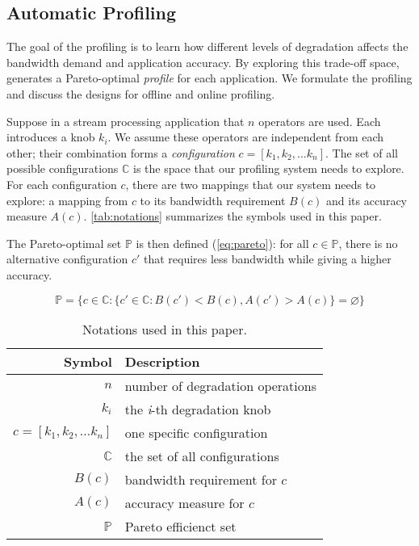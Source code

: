 \subsection{Automatic Profiling}
\label{sec:automatic-profiling}

The goal of the profiling is to learn how different levels of degradation
affects the bandwidth demand and application accuracy. By exploring this
trade-off space, \sysname{} generates a Pareto-optimal \textit{profile} for each
application. We formulate the profiling and discuss the designs for offline and
online profiling.

 Suppose in a stream processing application that $n$
\maybe{} operators are used. Each introduces a knob $k_i$. We assume these
operators are independent from each other; their combination forms a
\textit{configuration} $c = [k_{1}, k_{2}, ... k_{n}]$. The set of all possible
configurations $\mathbb{C}$ is the space that our profiling system needs to
explore. For each configuration $c$, there are two mappings that our system
needs to explore: a mapping from $c$ to its bandwidth requirement $B(c)$ and its
accuracy measure $A(c)$. \autoref{tab:notations} summarizes the symbols used in
this paper.

The Pareto-optimal set $\mathbb{P}$ is then defined (\autoref{eq:pareto}): for
all $c \in \mathbb{P}$, there is no alternative configuration $c'$ that requires
less bandwidth while giving a higher accuracy.

{\small
\begin{equation}
  \mathbb{P} = \{ c \in \mathbb{C} : \{ c' \in \mathbb{C}: B(c') < B(c),
  A(c') > A(c) \} = \varnothing\}
  \label{eq:pareto}
\end{equation}
}%

\begin{table}
  \footnotesize
  \centering
  \begin{tabular}{r l}
    \toprule
    \textbf{Symbol} & \textbf{Description} \\
    \midrule
    $n$ & number of degradation operations \\
    $k_i$ & the \textit{i}-th degradation knob \\
    $c = [k_{1}, k_{2}, ... k_{n}]$ & one specific configuration \\
    $\mathbb{C}$ & the set of all configurations \\
    \midrule
    $B(c)$ & bandwidth requirement for $c$ \\
    $A(c)$ & accuracy measure for $c$ \\
    $\mathbb{P}$ & Pareto efficienct set \\
    \bottomrule
  \end{tabular}
  \caption{Notations used in this paper.}
  \label{tab:notations}
\end{table}

